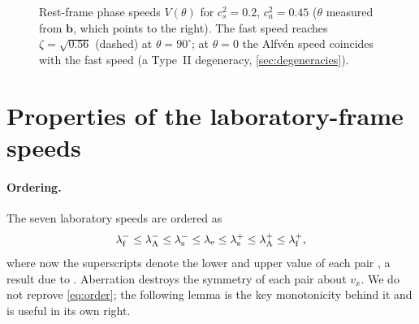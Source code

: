 \documentclass[11pt,a4paper,oneside,openany]{book}
\newcommand{\textcite}{\citet}
\newcommand{\parencite}{\citep}
\theoremstyle{definition}
\theoremstyle{plain}
\theoremstyle{remark}
\begin{document}
\begin{figure}[t]
\centering
{}
\caption{Rest-frame phase speeds $V(\theta)$ for $c_s^2=0.2$, $c_a^2=0.45$
($\theta$ measured from $\bm b$, which points to the right). The fast speed reaches
$\zeta=\sqrt{0.56}$ (dashed) at $\theta=90^\circ$; at $\theta=0$ the Alfvén speed
coincides with the fast speed (a Type~II degeneracy, \cref{sec:degeneracies}).}
\label{fig:friedrichs}
\end{figure}

\section{Properties of the laboratory-frame speeds}

\paragraph{Ordering.} The seven laboratory speeds are ordered as
\begin{equation}\label{eq:order}
\lambda_{\rm f}^-\le\lambda_{\rm A}^-\le\lambda_{\rm s}^-\le\lambda_{\rm e}\le
\lambda_{\rm s}^+\le\lambda_{\rm A}^+\le\lambda_{\rm f}^+ ,
\end{equation}
where now the superscripts denote the lower and upper value of each pair
\parencite[eq.~42]{Anton2010}, a result due to \textcite{Anile1989}. Aberration destroys
the symmetry of each pair about $v_x$. We do not reprove \eqref{eq:order}; the following
lemma is the key monotonicity behind it and is useful in its own right.
\end{document}
